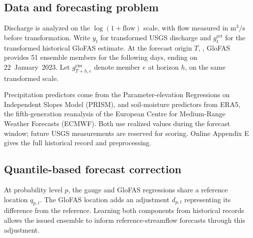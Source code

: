 \documentclass[12pt,letterpaper]{article}
\numberwithin{equation}{section}
\begin{document}
\subsection{Data and forecasting problem}

Discharge is analyzed on the \(\log(1+\mathrm{flow})\) scale, with flow
measured in \(\mathrm{m}^3/\mathrm{s}\) before transformation. Write
\(y_t\) for transformed USGS discharge and \(g_t^{\mathrm{ret}}\) for the
transformed historical GloFAS estimate. At the forecast origin \(T\),
\GlofasApplicationCurrentOriginDate{}, GloFAS provides 51 ensemble
members for the following \GlofasApplicationCurrentScoredHorizons{} days,
ending on 22~January~2023. Let \(g_{T+h,e}^{\mathrm{ens}}\) denote member
\(e\) at horizon \(h\), on the same transformed scale.

Precipitation predictors come from the Parameter-elevation Regressions on
Independent Slopes Model (PRISM), and soil-moisture predictors from ERA5,
the fifth-generation reanalysis of the European Centre for Medium-Range
Weather Forecasts (ECMWF). Both use realized values during the forecast
window; future USGS measurements are reserved for scoring. Online Appendix E
gives the full historical record and preprocessing.

\subsection{Quantile-based forecast correction}

At probability level \(p\), the gauge and GloFAS regressions share a
reference location \(q_{p,t}\). The GloFAS location adds an adjustment
\(d_{p,t}\) representing its difference from the reference. Learning both
components from historical records allows the issued ensemble to inform
reference-streamflow forecasts through this adjustment.
\end{document}
